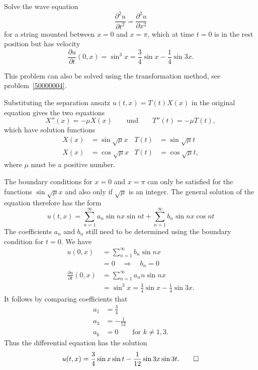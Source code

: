 Solve the wave equation
\[
\frac{\partial^2 u}{\partial t^2}=\frac{\partial^2 u}{\partial x^2}
\]
for a string mounted between $x=0$ and $x=\pi$, which at time $t=0$
is in the rest position but has velocity
\[
\frac{\partial u}{\partial t}(0, x)
=
\sin^3 x=\frac34\sin x-\frac14\sin 3x.
\]

\begin{hinweis}
This problem can also be solved using the transformation method, see
problem~\ref{50000004}.
\end{hinweis}

\begin{loesung}
Substituting the separation ansatz 
$u(t,x)=T(t)X(x)$ in the original equation gives the two equations
\[
X''(x)=-\mu X(x)\qquad\text{und}\qquad T''(t)=-\mu T(t),
\]
which have solution functions
\[
\begin{aligned}
X(x)&=\sin\sqrt{\mu}x & T(t)&=\sin\sqrt{\mu}t\\
X(x)&=\cos\sqrt{\mu}x & T(t)&=\cos\sqrt{\mu}t,
\end{aligned}
\]
where $\mu$ must be a positive number.

The boundary conditions for $x=0$ and $x=\pi$ can only be satisfied for
the functions $\sin\sqrt{\mu}x$ and also only if $\sqrt{\mu}$ is an
integer.
The general solution of the equation therefore has the form
\[
u(t,x)
=
\sum_{n=1}^\infty a_n\sin nx \sin nt+\sum_{n=1}^\infty b_n\sin nx\cos nt
\]
The coefficients $a_n$ and $b_n$ still need to be determined using the
boundary condition for $t=0$.
We have
\begin{align*}
u(0,x)&=
\sum_{n=1}^\infty b_n\sin nx
\\
&=0\quad\Rightarrow\quad b_n=0
\\
\frac{\partial u}{\partial t}(0,x)
&=
\sum_{n=1}^\infty a_nn\sin nx
\\
&=
\sin^3 x=\frac34\sin x-\frac14\sin 3x.
\end{align*}
It follows by comparing coefficients that
\begin{align*}
a_1&=\frac34\\
a_3&=-\frac{1}{12}\\
a_k&=0\qquad\text{for $k\ne 1,3$.}
\end{align*}
Thus the differential equation has the solution
\[
u(t,x)
= \frac34\sin x \sin t -\frac1{12}\sin 3x \sin 3t.
\qedhere
\]
\end{loesung}
